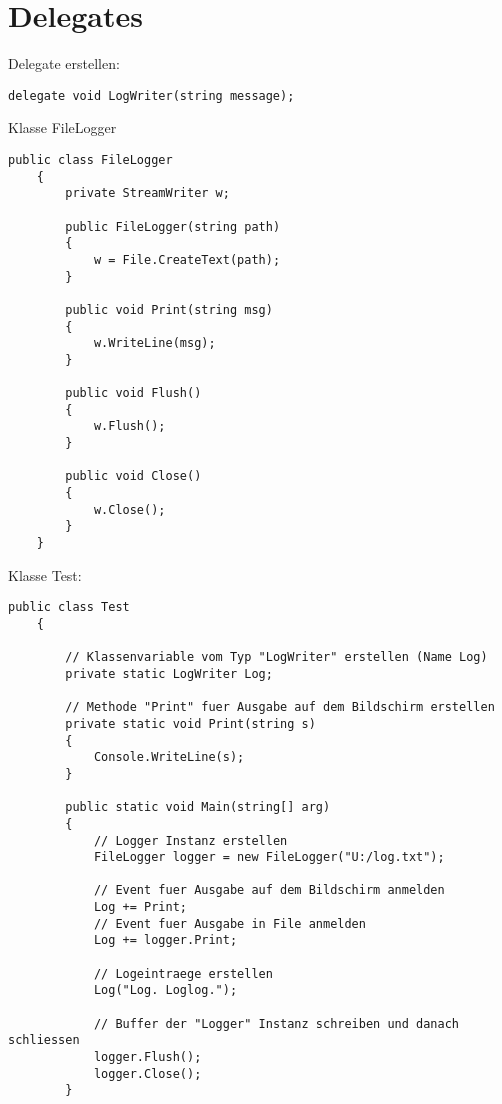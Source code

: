 \section{Delegates}
Delegate erstellen:
\begin{lstlisting}[style=Csharp]
	 delegate void LogWriter(string message);
\end{lstlisting}

Klasse FileLogger 
\begin{lstlisting}[style=Csharp]
    public class FileLogger
    {
        private StreamWriter w;

        public FileLogger(string path)
        {
            w = File.CreateText(path);
        }

        public void Print(string msg)
        {
            w.WriteLine(msg);
        }

        public void Flush()
        {
            w.Flush();
        }

        public void Close()
        {
            w.Close();
        }
    }
\end{lstlisting}

Klasse Test:
\begin{lstlisting}[style=Csharp]
	public class Test
	{

	    // Klassenvariable vom Typ "LogWriter" erstellen (Name Log)
	    private static LogWriter Log;
	
	    // Methode "Print" fuer Ausgabe auf dem Bildschirm erstellen
	    private static void Print(string s)
	    {
	        Console.WriteLine(s);
	    }
	
	    public static void Main(string[] arg)
	    {
	        // Logger Instanz erstellen
	        FileLogger logger = new FileLogger("U:/log.txt");
	
	        // Event fuer Ausgabe auf dem Bildschirm anmelden
	        Log += Print;
	        // Event fuer Ausgabe in File anmelden
	        Log += logger.Print; 
	
	        // Logeintraege erstellen
	        Log("Log. Loglog.");
	
	        // Buffer der "Logger" Instanz schreiben und danach schliessen
	        logger.Flush();
	        logger.Close();
	    }
 \end{lstlisting}